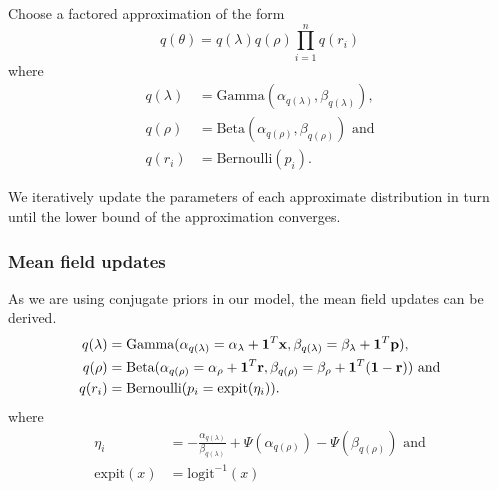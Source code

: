 \documentclass{beamer}
\begin{document}
\begin{frame}
Choose a factored approximation of the form
$$
q(\theta) = q(\lambda) q(\rho) \prod_{i=1}^n q(r_i)
$$
where
\begin{align*}
q(\lambda) &= \text{Gamma}(\alpha_{q(\lambda)}, \beta_{q(\lambda)}), \\
q(\rho) &= \text{Beta}(\alpha_{q(\rho)}, \beta_{q(\rho)}) \text{ and} \\
q(r_i) &= \text{Bernoulli}(p_i).
\end{align*}


We iteratively update the parameters of each approximate distribution
in turn until the lower bound of the approximation converges.

\end{frame}
 

\begin{frame}
\frametitle{Mean field updates}
As we are using conjugate priors in our model, the mean field updates can be derived.
\begin{align*}
q(\lambda) &= \text{Gamma}(\alpha_{q(\lambda)} = \alpha_\lambda + {\bf 1}^T {\bf x}, \beta_{q(\lambda)} = \beta_\lambda + {\bf 1}^T{\bf p}), \\
q(\rho) &= \text{Beta}(\alpha_{q(\rho)} = \alpha_\rho + {\bf 1}^T{\bf r}, \beta_{q(\rho)} = \beta_\rho + {\bf 1}^T({\bf 1} - {\bf r})) \text{ and} \\
q(r_i) &= \text{Bernoulli}(p_i = \text{expit}(\eta_i)).
\end{align*}
where
\begin{align*}
\eta_i &= - \frac{\alpha_{q(\lambda)}}{\beta_{q(\lambda)}} + \Psi(\alpha_{q(\rho)}) - \Psi(\beta_{q(\rho)}) \text{ and} \\
\text{expit}(x) &= \text{logit}^{-1}(x)
\end{align*}

\end{frame}
\end{document}
